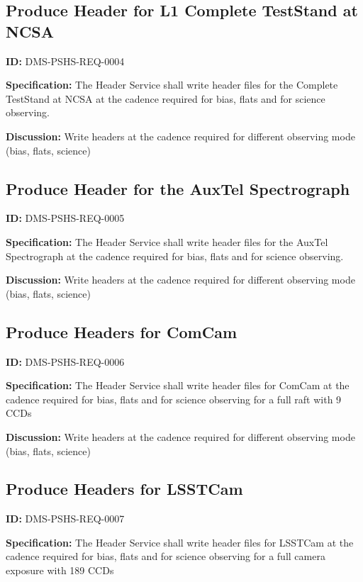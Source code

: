 \documentclass[SE,toc,lsstdraft]{lsstdoc}
\begin{document}
\subsection{Produce Header for L1 Complete TestStand at NCSA}

\label{DMS-PSHS-REQ-0004}
\textbf{ID:} DMS-PSHS-REQ-0004

\textbf{Specification:}
The Header Service shall write header files for the Complete TestStand at NCSA at the cadence required for bias, flats and for science observing.

\textbf{Discussion:}
Write headers at the cadence required for different observing mode (bias, flats, science)

\subsection{Produce Header for the AuxTel Spectrograph}

\label{DMS-PSHS-REQ-0005}
\textbf{ID:} DMS-PSHS-REQ-0005

\textbf{Specification:}
The Header Service shall write header files for the AuxTel Spectrograph at the cadence required for bias, flats and for science observing.

\textbf{Discussion:}
Write headers at the cadence required for different observing mode (bias, flats, science)

\subsection{Produce Headers for ComCam}

\label{DMS-PSHS-REQ-0006}
\textbf{ID:} DMS-PSHS-REQ-0006

\textbf{Specification:}
The Header Service shall write header files for ComCam at the cadence required for bias, flats and for science observing for a full raft with 9 CCDs

\textbf{Discussion:}
Write headers at the cadence required for different observing mode (bias, flats, science)

\subsection{Produce Headers for LSSTCam}

\label{DMS-PSHS-REQ-0007}
\textbf{ID:} DMS-PSHS-REQ-0007

\textbf{Specification:}
The Header Service shall write header files for LSSTCam at the cadence required for bias, flats and for science observing for a full camera exposure with 189 CCDs
\end{document}
